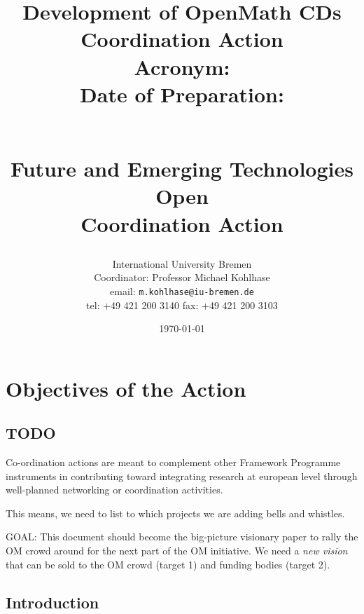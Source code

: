\documentclass{euproposal}
\begin{document}
\setcounter{part}{2}%


\title{Development of OpenMath CDs Coordination Action\\
  Acronym: \cdca\\
  Date of Preparation: \date{\today} \\
  Future and Emerging Technologies Open\\
  Coordination Action}
\author{International University  Bremen\\
  Coordinator: Professor Michael Kohlhase\\
  email: \texttt{m.kohlhase@iu-bremen.de}\\
  tel: +49 421 200 3140
  fax: +49 421 200 3103}

\setcounter{tocdepth}{1}\tableofcontents
\titlepage 
\maketitle

\chapter{Objectives of the Action}


\begin{quote}\sf
\end{quote}

\section*{TODO}
Co-ordination actions are meant to complement other Framework
Programme instruments in contributing toward integrating research at
european level through well-planned networking or coordination
activities.

This means, we need to list to which projects we are adding bells and
whistles.

GOAL: This document should become the big-picture visionary paper to
rally the OM crowd around for the next part of the OM initiative.  We
need a \emph{new vision} that can be sold to the OM crowd (target 1)
and funding bodies (target 2).


\section{Introduction}
\end{document}
